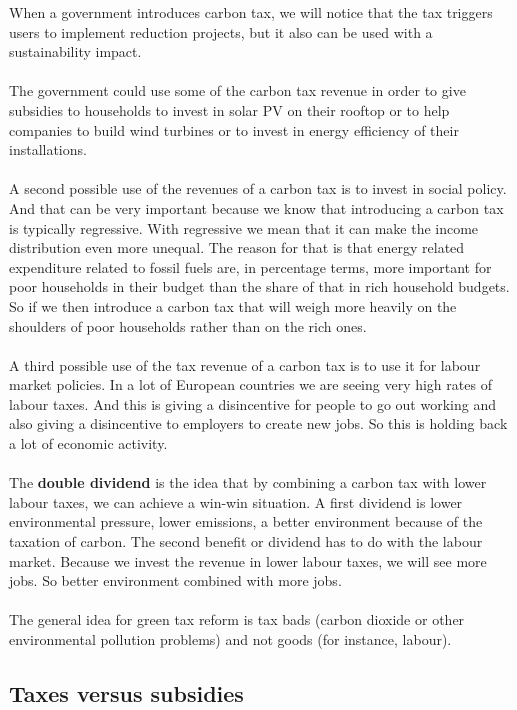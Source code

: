 \documentclass[../summary.tex]{subfiles}
\begin{document}
	  When a government introduces carbon tax, we will notice that the tax triggers users to implement reduction projects, but it also can be used with a sustainability impact. 
	  \\\\
	  The government could use some of the carbon tax revenue in order to give subsidies to households to invest in solar PV on their rooftop or to help companies to build wind turbines or to invest in energy efficiency of their installations. 
	  \\\\
	  A second possible use of the revenues of a carbon tax is to invest in social policy. And that can be very important because we know that introducing a carbon tax is typically regressive. With regressive we mean that it can make the income distribution even more unequal. The reason for that is that energy related expenditure related to fossil fuels are, in percentage terms, more important for poor households in their budget than the share of that in rich household budgets. So if we then introduce a carbon tax that will weigh more heavily on the shoulders of poor households rather than on the rich ones. 
	  \\\\
	  A third possible use of the tax revenue of a carbon tax is to use it for labour market policies. In a lot of European countries we are seeing very high rates of labour taxes. And this is giving a disincentive for people to go out working and also giving a disincentive to employers to create new jobs. So this is holding back a lot of economic activity.
	  \\\\
	  The \textbf{double dividend} is the idea that by combining a carbon tax with lower labour taxes, we can achieve a win-win situation. A first dividend is lower environmental pressure, lower emissions, a better environment because of the taxation of carbon. The second benefit or dividend has to do with the labour market. Because we invest the revenue in lower labour taxes, we will see more jobs. So better environment combined with more jobs.
	  \\\\
	  The general idea for green tax reform is tax bads (carbon dioxide or other environmental pollution problems) and not goods (for instance, labour).
	  \newpage
	  \subsection{Taxes versus subsidies}
	  
\end{document}
